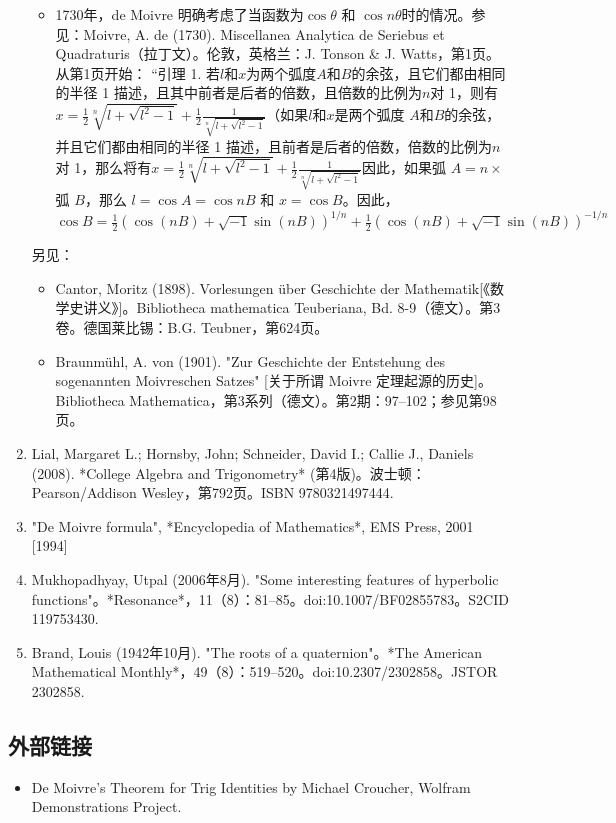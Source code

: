\begin{enumerate}
\begin{itemize}
\item 1730年，de Moivre 明确考虑了当函数为\( \cos \theta \) 和 \( \cos n\theta \)时的情况。参见：Moivre, A. de (1730). Miscellanea Analytica de Seriebus et Quadraturis（拉丁文）。伦敦，英格兰：J. Tonson & J. Watts，第1页。从第1页开始：  
“引理 1. 若\( l \)和\( x \)为两个弧度\( A \)和\( B \)的余弦，且它们都由相同的半径 1 描述，且其中前者是后者的倍数，且倍数的比例为\( n \)对 1，则有\(x = \frac{1}{2} \sqrt[n]{l + \sqrt{l^2 - 1}} + \frac{1}{2} \frac{1}{\sqrt[n]{l + \sqrt{l^2 - 1}}}\)（如果\( l \)和\( x \)是两个弧度 \( A \)和\( B \)的余弦，并且它们都由相同的半径 1 描述，且前者是后者的倍数，倍数的比例为\( n \)对 1，那么将有\(x = \frac{1}{2} \sqrt[n]{l + \sqrt{l^2 - 1}} + \frac{1}{2} \frac{1}{\sqrt[n]{l + \sqrt{l^2 - 1}}}\)因此，如果弧 \( A = n \times \) 弧 \( B \)，那么 \( l = \cos A = \cos nB \) 和 \( x = \cos B \)。因此，\(\cos B = \frac{1}{2} \left( \cos(nB) + \sqrt{-1} \sin(nB) \right)^{1/n} + \frac{1}{2} \left( \cos(nB) + \sqrt{-1} \sin(nB) \right)^{-1/n}\)
\end{itemize}
另见：  
\begin{itemize}
\item Cantor, Moritz (1898). Vorlesungen über Geschichte der Mathematik[《数学史讲义》]。Bibliotheca mathematica Teuberiana, Bd. 8-9（德文）。第3卷。德国莱比锡：B.G. Teubner，第624页。  
\item Braunmühl, A. von (1901). "Zur Geschichte der Entstehung des sogenannten Moivreschen Satzes" [关于所谓 Moivre 定理起源的历史]。Bibliotheca Mathematica，第3系列（德文）。第2期：97–102；参见第98页。
\end{itemize}
\item Lial, Margaret L.; Hornsby, John; Schneider, David I.; Callie J., Daniels (2008). *College Algebra and Trigonometry* (第4版)。波士顿：Pearson/Addison Wesley，第792页。ISBN 9780321497444.  
\item "De Moivre formula", *Encyclopedia of Mathematics*, EMS Press, 2001 [1994]  
\item Mukhopadhyay, Utpal (2006年8月). "Some interesting features of hyperbolic functions"。*Resonance*，11（8）：81–85。doi:10.1007/BF02855783。S2CID 119753430.  
\item Brand, Louis (1942年10月). "The roots of a quaternion"。*The American Mathematical Monthly*，49（8）：519–520。doi:10.2307/2302858。JSTOR 2302858.  
\end{enumerate}
\subsection{外部链接}  
\begin{itemize}
\item De Moivre's Theorem for Trig Identities by Michael Croucher, Wolfram Demonstrations Project.
\end{itemize}
